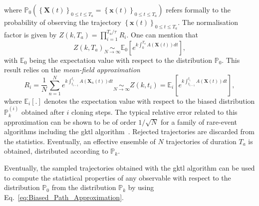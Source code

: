 where
$\mathbb{P}_{0}\left(\left\{ \mathbf{X}(t)\right\} _{0\leq t\leq T_{a}} = \left\{ \mathbf{x}(t)\right\} _{0\leq t\leq T_{a}}\right)$ 
refers formally to the probability of observing the trajectory 
$\left\{ \mathbf{x}(t)\right\} _{0\leq t\leq T_{a}}$.
The normalisation factor is given by $Z(k,T_a)=\prod_{i=1}^{T_a/\tau}R_i$.
%
One can mention that
\begin{equation}
\label{eq:mean_field}
Z(k,T_a) \underset{N\to \infty}{\sim} \mathbb{E}_0\left[e^{k\int_{0}^{T_{a}}A(\mathbf{X}(t))dt}\right],
\end{equation}
with $\mathbb{E}_{0}$ being the expectation value with respect to the
distribution $\mathbb{P}_{0}$.
This result relies on the \textit{mean-field approximation}
\begin{equation}
R_{i}=\frac{1}{N}\sum_{n=1}^{N}e^{k\int_{t_{i-1}}^{t_{i}}A(\mathbf{X}_{n}(t))dt}\underset{N\rightarrow\infty}{\sim} Z(k,t_i)= \mathbb{E}_{i}\left[e^{k\int_{t_{i-1}}^{t_{i}}A(\mathbf{X}(t))dt}\right],
\label{eq:Mean_Field_Approximation}
\end{equation}
where $\mathbb{E}_{i}[.]$ denotes the expectation value with respect to the biased distribution $\mathbb{P}_k^{(i)}$ obtained after $i$ cloning steps.
The typical relative error related to this approximation can be shown to be of order $1/\sqrt{N}$ for a family of rare-event algorithms including the \ac{gktl} algorithm~\citep{DelMoralBook,DelMoral2013}.
%
Rejected trajectories are discarded from the statistics.
Eventually, an effective ensemble of $N$ trajectories of duration $T_{a}$ is obtained, distributed according to $\mathbb{P}_{k}$.

%
% 
%
%
Eventually, the sampled trajectories obtained with the \ac{gktl} algorithm can be used to compute the statistical properties of any observable with respect to the distribution $\mathbb{P}_{0}$ from the distribution $\mathbb{P}_{k}$ by using Eq.~\eqref{eq:Biased_Path_Approximation}.
%

